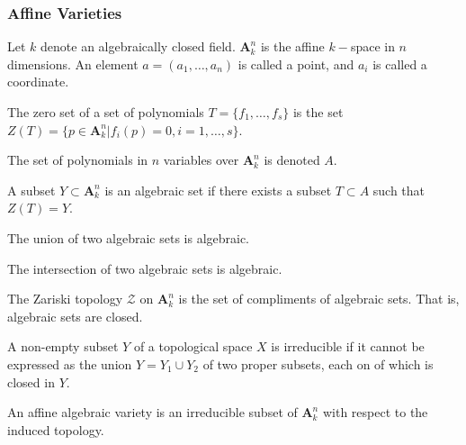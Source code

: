             \subsubsection{Affine Varieties}
                Let $k$ denote an algebraically closed field.
                $\textbf{A}_{k}^n$ is the affine $k-$space in
                $n$ dimensions. An element $a=(a_1,\hdots, a_n)$
                is called a point, and $a_i$ is called a coordinate.
                \begin{definition}
                    The zero set of a set of polynomials
                    $T=\{f_{1},\hdots,f_{s}\}$ is the set
                    $Z(T)%
                     =\{p\in\textbf{A}_{k}^{n}|f_{i}(p)=0,%
                        i=1,\hdots,s\}$.
                \end{definition}
                The set of polynomials in $n$ variables over
                $\textbf{A}_{k}^{n}$ is denoted $A$.
                \begin{definition}
                    A subset $Y\subset\textbf{A}_{k}^{n}$ is an
                    algebraic set if there exists a subset
                    $T\subset{A}$ such that $Z(T)=Y$.
                \end{definition}
                \begin{theorem}
                    The union of two algebraic
                    sets is algebraic.
                \end{theorem}
                \begin{theorem}
                    The intersection of two algebraic
                    sets is algebraic.
                \end{theorem}
                \begin{definition}
                    The Zariski topology $\mathcal{Z}$ on
                    $\textbf{A}_{k}^{n}$ is the set of compliments
                    of algebraic sets. That is,
                    algebraic sets are closed.
                \end{definition}
                \begin{definition}
                    A non-empty subset $Y$ of a topological space
                    $X$ is irreducible if it cannot be expressed
                    as the union $Y={Y_{1}}\cup{Y_{2}}$ of
                    two proper subsets, each on of which is
                    closed in $Y$.
                \end{definition}
                \begin{definition}
                    An affine algebraic variety is an irreducible
                    subset of $\textbf{A}_{k}^{n}$ with respect
                    to the induced topology.
                \end{definition}
